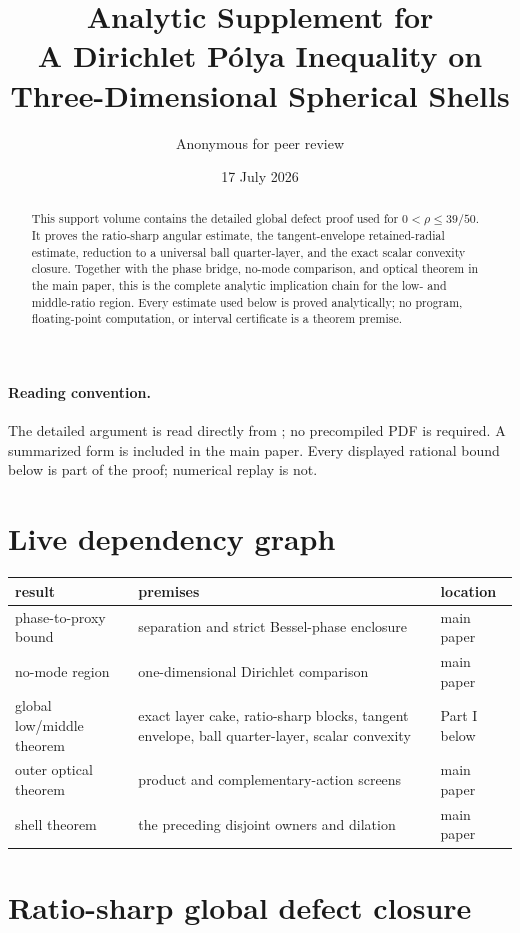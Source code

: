 \documentclass[11pt]{article}
\title{Analytic Supplement for\\
A Dirichlet P\'olya Inequality on\\
Three-Dimensional Spherical Shells}
\author{Anonymous for peer review}
\date{17 July 2026}
\theoremstyle{remark}
\begin{document}
\maketitle

\begin{abstract}
This support volume contains the detailed global defect proof used for
$0<\rho\leq39/50$.  It proves the ratio-sharp angular estimate, the
tangent-envelope retained-radial estimate, reduction to a universal ball
quarter-layer, and the exact scalar convexity closure.  Together with the
phase bridge, no-mode comparison, and optical theorem in the main paper,
this is the complete analytic implication chain for the low- and middle-ratio
region.  Every estimate used below is proved analytically; no program,
floating-point computation, or interval certificate is a theorem premise.
\end{abstract}

\paragraph{Reading convention.}
The detailed argument is read directly from
; no precompiled PDF is
required.  A summarized form is included in the main paper.  Every displayed
rational bound below is part of the proof; numerical replay is not.

\section*{Live dependency graph}

\begin{center}
\small
\renewcommand{\arraystretch}{1.15}
\begin{tabular}{@{}p{3.3cm}p{5.1cm}p{3.2cm}@{}}
\toprule
result&premises&location\\
\midrule
phase-to-proxy bound&
separation and strict Bessel-phase enclosure&
main paper\\
no-mode region&
one-dimensional Dirichlet comparison&
main paper\\
global low/middle theorem&
exact layer cake, ratio-sharp blocks, tangent envelope,
ball quarter-layer, scalar convexity&
Part I below\\
outer optical theorem&
product and complementary-action screens&
main paper\\
shell theorem&
the preceding disjoint owners and dilation&
main paper\\
\bottomrule
\end{tabular}
\end{center}

\renewcommand{\thesection}{\Roman{section}}
\tableofcontents
\clearpage

\section{Ratio-sharp global defect closure}
\label{part:ratio}


\end{document}

